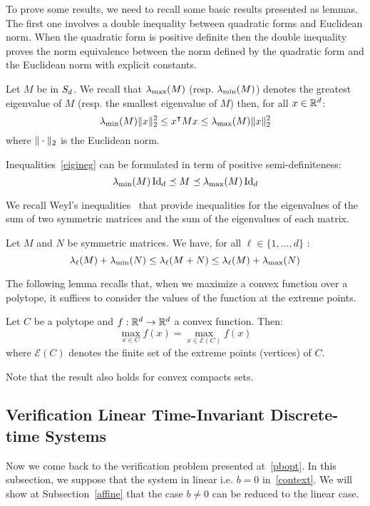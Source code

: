 \documentclass[10pt]{article}
\begin{document}
To prove some results, we need to recall some basic results presented as lemmas. The first one involves a double inequality between quadratic forms and Euclidean norm. When the quadratic form is positive definite then the double inequality proves the norm equivalence between the norm defined by the quadratic form and the Euclidean norm with explicit constants. 
\begin{lemma}
\label{lemma1}
Let $M$ be in $S_d$. We recall that $\lambda_{\operatorname{max}}(M)$ (resp. $\lambda_{\operatorname{min}}(M)$) denotes the greatest eigenvalue of $M$ (resp. the smallest eigenvalue of $M$) then, for all $x\in \mathbb R^d$:
\begin{equation}
\label{eigineg}
\lambda_{\operatorname{min}}(M)\| x\|_2^2\leq x^\intercal M x\leq \lambda_{\operatorname{max}}(M) \| x\|_2^2
\end{equation}
where $\| \cdot\|_2$ is the Euclidean norm. 
\end{lemma}
Inequalities~\eqref{eigineg} can be formulated in term of positive semi-definiteness:
\[
\lambda_{\operatorname{min}}(M)\operatorname{Id}_d\preceq M\preceq \lambda_{\operatorname{max}}(M)\operatorname{Id}_d
\]

We recall Weyl's inequalities~\cite{horn1990matrix} that provide inequalities for the eigenvalues of the sum of two symmetric matrices and the sum of the eigenvalues of each matrix.  
\begin{lemma}
\label{le}
Let $M$ and $N$ be symmetric matrices. We have, for all $\ell\in\{1,\ldots,d\}$ :
\[
\lambda_\ell(M)+\lambda_{\operatorname{min}}(N)\leq \lambda_\ell(M+N)\leq \lambda_\ell(M)+\lambda_{\operatorname{max}}(N)
\]
\end{lemma}
The following lemma recalls that, when we maximize a convex function over a polytope, it suffices to consider the values of the function at the extreme points. 
\begin{lemma}
\label{lemma2}
Let $C$ be a polytope and $f:\mathbb R^d\to\mathbb R^d$ a convex function. Then:
\[
\max_{x\in C} f(x)=\max_{x\in \mathcal{E}(C)} f(x)
\]
where $\mathcal{E}(C)$ denotes the finite set of the extreme points (vertices) of $C$.
\end{lemma}
Note that the result also holds for convex compacts sets.  
\subsection{Verification Linear Time-Invariant Discrete-time Systems}
\label{mainsub}
Now we come back to the verification problem presented at~\eqref{pbopt}. In this subsection, we suppose that the system in linear i.e. $b=0$ in~\eqref{context}. We will show at Subsection~\ref{affine} that the case $b\neq 0$ can be reduced to the linear case.
\end{document}
